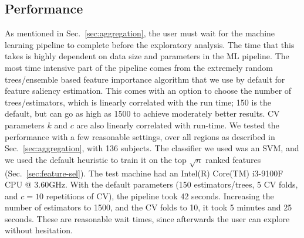 \subsection{Performance}
\label{sec:performance}
\noindent As mentioned in Sec.~\ref{sec:aggregation}, the user must wait for the machine learning pipeline to complete before the exploratory analysis. The time that this takes is highly dependent on data size and parameters in the ML pipeline. The most time intensive part of the pipeline comes from the extremely random trees/ensemble based feature importance algorithm that we use by default for feature saliency estimation. This comes with an option to choose the number of trees/estimators, which is linearly correlated with the run time; 150 is the default, but can go as high as 1500 to achieve moderately better results. CV parameters $k$ and $c$ are also linearly correlated with run-time. We tested the performance with a few reasonable settings, over all regions as described in Sec.~\ref{sec:aggregation},  with 136 subjects. The classifier we used was an SVM, and we used the default heuristic to train it on the top $\sqrt{n}$ ranked features (Sec.~\ref{sec:feature-sel}). The test machine had an Intel(R) Core(TM) i3-9100F CPU @ 3.60GHz. With the default parameters (150 estimators/trees, 5 CV folds, and $c=10$ repetitions of CV), the pipeline took 42 seconds. Increasing the number of estimators to 1500, and the CV folds to 10, it took 5 minutes and 25 seconds. These are reasonable wait times, since afterwards the user can explore without hesitation.